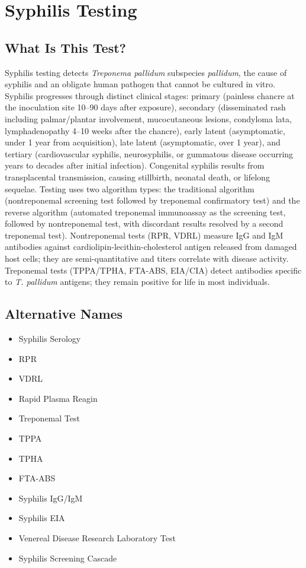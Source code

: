 \chapter{Syphilis Testing}

\section*{What Is This Test?}
Syphilis testing detects \textit{Treponema pallidum} subspecies \textit{pallidum}, the cause of syphilis and an obligate human pathogen that cannot be cultured in vitro. Syphilis progresses through distinct clinical stages: primary (painless chancre at the inoculation site 10--90 days after exposure), secondary (disseminated rash including palmar/plantar involvement, mucocutaneous lesions, condyloma lata, lymphadenopathy 4--10 weeks after the chancre), early latent (asymptomatic, under 1 year from acquisition), late latent (asymptomatic, over 1 year), and tertiary (cardiovascular syphilis, neurosyphilis, or gummatous disease occurring years to decades after initial infection). Congenital syphilis results from transplacental transmission, causing stillbirth, neonatal death, or lifelong sequelae. Testing uses two algorithm types: the traditional algorithm (nontreponemal screening test followed by treponemal confirmatory test) and the reverse algorithm (automated treponemal immunoassay as the screening test, followed by nontreponemal test, with discordant results resolved by a second treponemal test). Nontreponemal tests (RPR, VDRL) measure IgG and IgM antibodies against cardiolipin-lecithin-cholesterol antigen released from damaged host cells; they are semi-quantitative and titers correlate with disease activity. Treponemal tests (TPPA/TPHA, FTA-ABS, EIA/CIA) detect antibodies specific to \textit{T. pallidum} antigens; they remain positive for life in most individuals.

\section*{Alternative Names}
\begin{itemize}
  \item Syphilis Serology
  \item RPR
  \item VDRL
  \item Rapid Plasma Reagin
  \item Treponemal Test
  \item TPPA
  \item TPHA
  \item FTA-ABS
  \item Syphilis IgG/IgM
  \item Syphilis EIA
  \item Venereal Disease Research Laboratory Test
  \item Syphilis Screening Cascade
\end{itemize}
